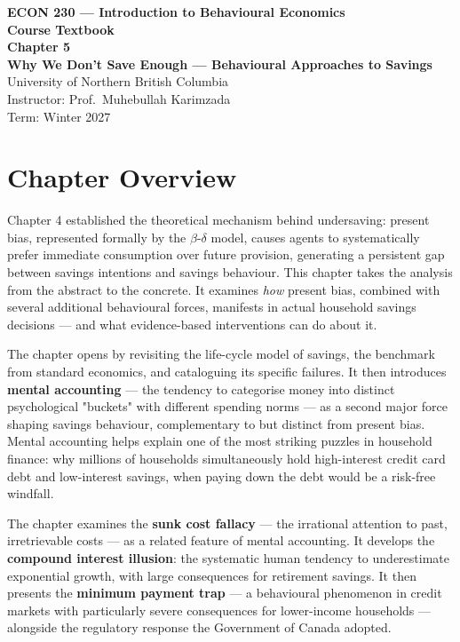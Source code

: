 \documentclass[12pt, letterpaper]{article}
\begin{document}
\begin{titlepage}
\centering\vspace*{3cm}
{\Large\bfseries\color{econblue} ECON 230 --- Introduction to Behavioural Economics\\[1em]}
{\large\bfseries Course Textbook\\[2em]}
{\LARGE\bfseries\color{econblue} Chapter 5\\[0.5em]}
{\Large\bfseries Why We Don't Save Enough --- Behavioural Approaches to Savings\\[2em]}
\vfill
{\normalsize University of Northern British Columbia\\
Instructor: Prof.\ Muhebullah Karimzada\\
Term: Winter 2027}
\end{titlepage}
\tableofcontents
\newpage


\medskip


\section*{Chapter Overview}


Chapter 4 established the theoretical mechanism behind undersaving: present bias, represented formally by the $\beta$-$\delta$ model, causes agents to systematically prefer immediate consumption over future provision, generating a persistent gap between savings intentions and savings behaviour. This chapter takes the analysis from the abstract to the concrete. It examines \textit{how} present bias, combined with several additional behavioural forces, manifests in actual household savings decisions --- and what evidence-based interventions can do about it.

The chapter opens by revisiting the life-cycle model of savings, the benchmark from standard economics, and cataloguing its specific failures. It then introduces \textbf{mental accounting} --- the tendency to categorise money into distinct psychological "buckets" with different spending norms --- as a second major force shaping savings behaviour, complementary to but distinct from present bias. Mental accounting helps explain one of the most striking puzzles in household finance: why millions of households simultaneously hold high-interest credit card debt and low-interest savings, when paying down the debt would be a risk-free windfall.

The chapter examines the \textbf{sunk cost fallacy} --- the irrational attention to past, irretrievable costs --- as a related feature of mental accounting. It develops the \textbf{compound interest illusion}: the systematic human tendency to underestimate exponential growth, with large consequences for retirement savings. It then presents the \textbf{minimum payment trap} --- a behavioural phenomenon in credit markets with particularly severe consequences for lower-income households --- alongside the regulatory response the Government of Canada adopted.
\end{document}
